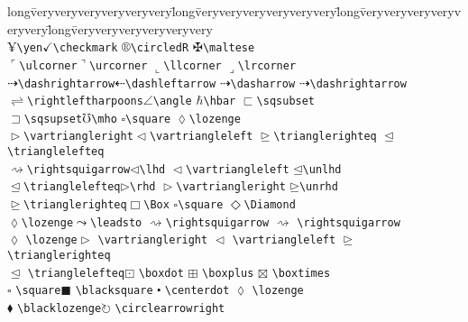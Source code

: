 \documentclass{asl}
\begin{document}
\begin{tabbing}
long\= veryveryveryveryveryvery\=
long\= veryveryveryveryveryvery\=
long\= veryveryveryveryveryvery\=
long\= veryveryveryveryveryvery
\kill \\
$\yen$\>\verb+\yen+\>$\checkmark$\>\verb+\checkmark+\>
$\circledR$\>\verb+\circledR+\>
$\maltese$\>\verb+\maltese+\\
$\ulcorner$\>\verb+\ulcorner+\>$\urcorner$\>\verb+\urcorner+\>
$\llcorner$\>\verb+\llcorner+\>
$\lrcorner$\>\verb+\lrcorner+\\
$\dashrightarrow$\>\verb+\dashrightarrow+\>$\dashleftarrow$\>\verb+\dashleftarrow+\>
$\dasharrow$\>\verb+\dasharrow+\>
$\dashrightarrow$\>\verb+\dashrightarrow+\\
$\rightleftharpoons$\>\verb+\rightleftharpoons+\>$\angle$\>\verb+\angle+\>
$\hbar$\>\verb+\hbar+\>
$\sqsubset$\>\verb+\sqsubset+\\
$\sqsupset$\>\verb+\sqsupset+\>$\mho$\>\verb+\mho+\>
$\square$\>\verb+\square+\>
$\lozenge$\>\verb+\lozenge+\\
$\vartriangleright$\>\verb+\vartriangleright+\>$\vartriangleleft$\>\verb+\vartriangleleft+\>
$\trianglerighteq$\>\verb+\trianglerighteq+\>
$\trianglelefteq$\>\verb+\trianglelefteq+\\
$\rightsquigarrow$\>\verb+\rightsquigarrow+\>$\lhd$\>\verb+\lhd+\>
$\vartriangleleft$\>\verb+\vartriangleleft+\>
$\unlhd$\>\verb+\unlhd+\\
$\trianglelefteq$\>\verb+\trianglelefteq+\>$\rhd$\>\verb+\rhd+\>
$\vartriangleright$\>\verb+\vartriangleright+\>
$\unrhd$\>\verb+\unrhd+\\
$\trianglerighteq$\>\verb+\trianglerighteq+\>$\Box$\>\verb+\Box+\>
$\square$\>\verb+\square+\>
$\Diamond$\>\verb+\Diamond+\\
$\lozenge$\>\verb+\lozenge+\>$\leadsto$\>\verb+\leadsto+\>
$\rightsquigarrow$\>\verb+\rightsquigarrow+
\>
$\rightsquigarrow$ \>\verb+\rightsquigarrow+\\
$\lozenge$ \>\verb+\lozenge+\>$\vartriangleright$ \>\verb+\vartriangleright+\>
$\vartriangleleft$ \>\verb+\vartriangleleft+\>
$\trianglerighteq$ \>\verb+\trianglerighteq+\\
$\trianglelefteq$ \>\verb+\trianglelefteq+\>$\boxdot$ \>\verb+\boxdot+\>
$\boxplus$ \>\verb+\boxplus+\>
$\boxtimes$ \>\verb+\boxtimes+\\
$\square$ \>\verb+\square+\>$\blacksquare$ \>\verb+\blacksquare+\>
$\centerdot$ \>\verb+\centerdot+\>
$\lozenge$ \>\verb+\lozenge+\\
$\blacklozenge$ \>\verb+\blacklozenge+\>$\circlearrowright$ \>\verb+\circlearrowright+\>

\end{tabbing}
\end{document}
